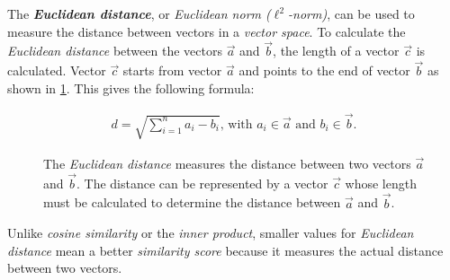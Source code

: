 \documentclass{article}
\begin{document}
The \textbf{\textit{Euclidean distance}}, or \textit{Euclidean norm ($\ell^{2}$-norm)}, can be used to measure the distance between vectors in a \textit{vector space}. To calculate the \textit{Euclidean distance} between the vectors $\Vec{a}$ and $\vec{b}$, the length of a vector $\vec{c}$ is calculated. Vector $\vec{c}$ starts from vector $\vec{a}$ and points to the end of vector $\vec{b}$ as shown in \cref{euclideanSimilarityFigure}. This gives the following formula:

\begin{align}
	 d = \sqrt{\sum_{i=1}^{n}{a_{i} - b_{i}}} 
  \text{, with } a_{i} \in \vec{a} \text{ and } b_{i} \in \vec{b}.
\end{align}

\begin{figure}[H]
    \centering
{}
\caption{The \textit{Euclidean distance} measures the distance between two vectors $\vec{a}$ and $\vec{b}$. The distance can be represented by a vector $\vec{c}$ whose length must be calculated to determine the distance between $\vec{a}$ and $\vec{b}$.}
\label{euclideanSimilarityFigure}
\end{figure}

Unlike \textit{cosine similarity} or the \textit{inner product}, smaller values for \textit{Euclidean distance} mean a better \textit{similarity score} because it measures the actual distance between two vectors.
\end{document}
